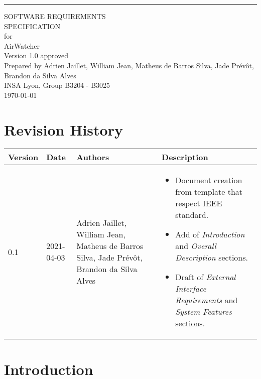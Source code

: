 \documentclass{report}
\def\myversion{1.0 }
\def\authors{Adrien Jaillet, William Jean, Matheus de Barros Silva, Jade Prévôt, Brandon da Silva Alves}
\def\project{AirWatcher}
\def\organization{INSA Lyon, Group B3204 - B3025}
\begin{document}
\begin{flushright}
	\rule{16cm}{5pt}\vskip1cm
	\begin{bfseries}
		\Huge{SOFTWARE REQUIREMENTS\\ SPECIFICATION}\\
		\vspace{1.9cm}
		for\\
		\vspace{1.9cm}
		\project\\
		\vspace{1.9cm}
		\LARGE{Version \myversion approved}\\
		\vspace{1.9cm}
		Prepared by \authors\\
		\vspace{1.9cm}
		\organization\\
		\vspace{1.9cm}
		\today\\
	\end{bfseries}
\end{flushright}

\tableofcontents

\chapter*{Revision History}

\begin{center}
	\begin{tabular}{|m{1.5cm}|m{1.7cm}|m{4cm}|m{7.3cm}|}
		\hline
		\textbf{Version} & \textbf{Date} & \textbf{Authors} & \textbf{Description}\\
		\hline
		0.1 &
		2021-04-03 &
		\authors &
		\begin{itemize}
			\item Document creation from template that respect IEEE standard.
			\item Add of \textit{Introduction} and \textit{Overall Description}
			sections.
			\item Draft of \textit{External Interface Requirements} and
			\textit{System Features} sections.
	\end{itemize}\\
		\hline
	\end{tabular}
\end{center}

\chapter{Introduction}
\end{document}
